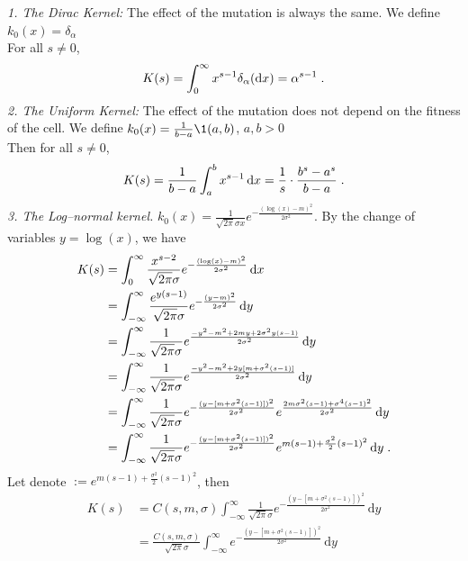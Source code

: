 \documentclass[11pt]{amsart}
\newcommand{\diff}{\,\mathrm{d}}
\newcommand{\dd}{\mathrm{d}}
\begin{document}
\textit{1. The Dirac Kernel:} The effect of the mutation is always the same. We define $k_0(x) = \delta_\alpha$ \\
For all $s \neq 0$, 
\begin{align*}
    K(s) = \int_0^\infty x^{s-1} \delta_\alpha(\dd x) = \alpha^{s-1}
    \eqfinp
\end{align*}
\textit{2. The Uniform Kernel:} The effect of the mutation does not depend on the fitness of the cell. We define $k_0(x) = \frac{1}{b-a}\1{(a,b)}$, $a,b > 0$ \\
Then for all $s \neq 0$, 
    \begin{align*}
        K(s) = \frac{1}{b-a}\int_a^b x^{s-1}\diff x = \frac1s \cdot\frac{b^s - a^s}{b-a}
        \eqfinp
    \end{align*}
\textit{3. The Log--normal kernel.} $k_0(x) = \frac{1}{\sqrt{2\pi}\sigma x} e^{-\frac{(\log(x)-m)^2}{2\sigma^2}}$.
By the change of variables $y = \log(x)$, we have
    \begin{align*}
        K(s) 
        &= \int_0^\infty \frac{x^{s-2}}{\sqrt{2\pi}\sigma} e^{-\frac{(\log(x)-m)^2}{2\sigma^2}} \diff x \\
        &= \int_{-\infty}^\infty \frac{e^{y(s-1)}}{\sqrt{2\pi}\sigma} e^{-\frac{(y-m)^2}{2\sigma^2}} \diff y \\
        &=  \int_{-\infty}^\infty \frac{1}{\sqrt{2\pi}\sigma} e^{\frac{-y^2 - m^2 + 2m y + 2\sigma^2 y(s-1)}{2\sigma^2}} \diff y \\
        &=  \int_{-\infty}^\infty \frac{1}{\sqrt{2\pi}\sigma} e^{\frac{-y^2 - m^2 + 2y[m + \sigma^2 (s-1)]}{2\sigma^2}} \diff y \\
        &=  \int_{-\infty}^\infty \frac{1}{\sqrt{2\pi}\sigma} 
        e^{-\frac{(y - [m + \sigma^2 (s-1)])^2}{2\sigma^2}}
        e^{\frac{2m \sigma^2(s-1)+\sigma^4(s-1)^2}{2\sigma^2}}\diff y \\
        &=  \int_{-\infty}^\infty \frac{1}{\sqrt{2\pi}\sigma} 
        e^{-\frac{(y - [m + \sigma^2 (s-1)])^2}{2\sigma^2}}
        e^{m (s-1)+\frac{\sigma^2}{2}(s-1)^2}\diff y
        \eqfinp
    \end{align*}
Let denote $  := e^{m (s-1)+\frac{\sigma^2}{2}(s-1)^2}$, then 
\begin{align*}
    K(s) 
    &=  C(s,m,\sigma) \int_{-\infty}^\infty \frac{1}{\sqrt{2\pi}\sigma} 
        e^{-\frac{(y - [m + \sigma^2 (s-1)])^2}{2\sigma^2}}\diff y
        \\
        &=  \frac{C(s,m,\sigma)}{\sqrt{2\pi}\sigma} \int_{-\infty}^\infty
        e^{-\frac{(y - [m + \sigma^2 (s-1)])^2}{2\sigma^2}}\diff y
\end{align*}
\end{document}
